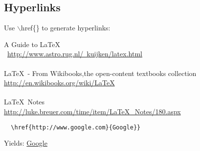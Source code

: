 
\subsection{Hyperlinks}
Use $\backslash$href\{\} to generate hyperlinks:

A Guide to \LaTeX\\\
\href{http://www.astro.rug.nl/~kuijken/latex.html}
{http://www.astro.rug.nl/~kuijken/latex.html}
\\
\\
\LaTeX\ - From Wikibooks,the open-content textbooks collection\\
\href{http://en.wikibooks.org/wiki/LaTeX}{http://en.wikibooks.org/wiki/LaTeX}
\\
\\
\LaTeX\ Notes\\
\href{http://luke.breuer.com/time/item/LaTeX\_Notes/180.aspx}{http://luke.breuer.com/time/item/LaTeX\_Notes/180.aspx}


\begin{verbatim}
  \href{http://www.google.com}{Google}}
\end{verbatim}

\noindent Yields: \href{http://www.google.com}{Google}

